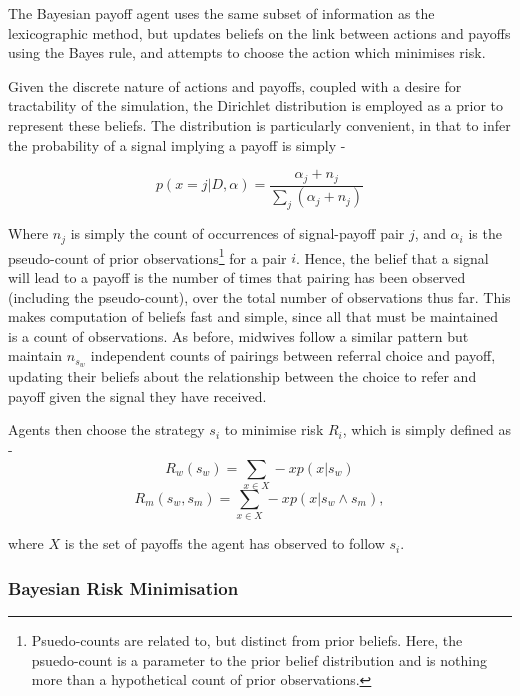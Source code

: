 \documentclass[graybox]{svmult}
\begin{document}
The Bayesian payoff agent uses the same subset of information as the lexicographic method, but updates beliefs on the link between actions and payoffs using the Bayes rule, and attempts to choose the action which minimises risk.

Given the discrete nature of actions and payoffs, coupled with a desire for tractability of the
simulation, the Dirichlet distribution is employed as a prior to represent these beliefs. 
The distribution is particularly convenient, in that to infer the
probability of a signal implying a payoff is
simply -

\begin{equation}
p(x=j|D,\alpha)=\frac{\alpha_{j}+n_{j}}{\sum_{j}(\alpha_{j}+n_{j})}\label{eq:posterior}
\end{equation}


Where \(n_{j}\) is simply the count of occurrences of signal-payoff pair \(j\), and \(\alpha_{i}\) is the pseudo-count of prior observations\footnote{Psuedo-counts are related to, but distinct from prior beliefs. Here, the psuedo-count is a parameter to the prior belief distribution and is nothing more than a hypothetical count of prior observations.} for a pair \(i\). Hence,
the belief that a signal will lead to a payoff is the number
of times that pairing has been observed (including the pseudo-count),
over the total number of observations thus far. This makes computation
of beliefs fast and simple, since all that must be maintained is
a count of observations.
As before, midwives follow a similar pattern but maintain \(n_{s_{w}}\) independent counts of pairings between referral choice and payoff, updating their beliefs about the relationship between the choice to refer and payoff given the signal they have received.

Agents then choose the strategy $s_{i}$ to minimise risk $R_{i}$, which is simply defined as - 
\begin{equation}
R_{w}(s_{w}) = \sum_{x \in X} -xp(x | s_{w})
\end{equation}
\begin{equation}
R_{m}(s_{w}, s_{m}) = \sum_{x \in X} -xp(x | s_{w}\wedge s_{m}),
\end{equation}

where $X$ is the set of payoffs the agent has observed to follow $s_{i}$.

\subsubsection{Bayesian Risk Minimisation}
\end{document}

